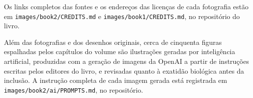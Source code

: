 Os links completos das fontes e os endereços das licenças de cada
fotografia estão em \texttt{images/\allowbreak book2/\allowbreak CREDITS.md} e
\texttt{images/\allowbreak book1/\allowbreak CREDITS.md}, no repositório do livro.

\bigskip
Além das fotografias e dos desenhos originais, cerca de cinquenta
figuras espalhadas pelos capítulos do volume são ilustrações geradas
por inteligência artificial, produzidas com a geração de imagens da
OpenAI a partir de instruções escritas pelos editores do livro, e
revisadas quanto à exatidão biológica antes da inclusão. A instrução
completa de cada imagem gerada está registrada em
\texttt{images/\allowbreak book2/\allowbreak ai/\allowbreak PROMPTS.md}, no repositório.
\par\endgroup
\clearpage
